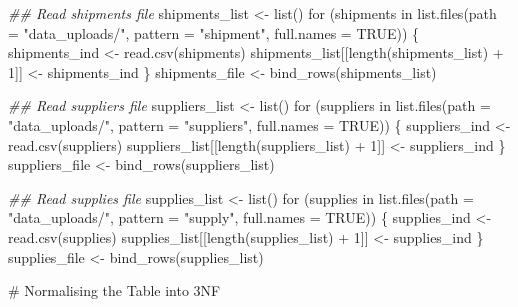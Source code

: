 \documentclass[
  letterpaper,
  DIV=11,
  numbers=noendperiod]{scrartcl}
\newenvironment{Shaded}{\begin{snugshade}}{\end{snugshade}}
\newcommand{\AttributeTok}[1]{\textcolor[rgb]{0.40,0.45,0.13}{#1}}
\newcommand{\CommentTok}[1]{\textcolor[rgb]{0.37,0.37,0.37}{#1}}
\newcommand{\ConstantTok}[1]{\textcolor[rgb]{0.56,0.35,0.01}{#1}}
\newcommand{\ControlFlowTok}[1]{\textcolor[rgb]{0.00,0.23,0.31}{#1}}
\newcommand{\DecValTok}[1]{\textcolor[rgb]{0.68,0.00,0.00}{#1}}
\newcommand{\DocumentationTok}[1]{\textcolor[rgb]{0.37,0.37,0.37}{\textit{#1}}}
\newcommand{\FunctionTok}[1]{\textcolor[rgb]{0.28,0.35,0.67}{#1}}
\newcommand{\NormalTok}[1]{\textcolor[rgb]{0.00,0.23,0.31}{#1}}
\newcommand{\OtherTok}[1]{\textcolor[rgb]{0.00,0.23,0.31}{#1}}
\newcommand{\SpecialCharTok}[1]{\textcolor[rgb]{0.37,0.37,0.37}{#1}}
\newcommand{\StringTok}[1]{\textcolor[rgb]{0.13,0.47,0.30}{#1}}
\begin{document}
\begin{Shaded}
\begin{Highlighting}[numbers=left,,]
\DocumentationTok{\#\# Read shipments file}
\NormalTok{shipments\_list }\OtherTok{\textless{}{-}} \FunctionTok{list}\NormalTok{()}
\ControlFlowTok{for}\NormalTok{ (shipments }\ControlFlowTok{in} \FunctionTok{list.files}\NormalTok{(}\AttributeTok{path =} \StringTok{"data\_uploads/"}\NormalTok{, }\AttributeTok{pattern =} \StringTok{"shipment"}\NormalTok{, }\AttributeTok{full.names =} \ConstantTok{TRUE}\NormalTok{)) \{}
\NormalTok{  shipments\_ind }\OtherTok{\textless{}{-}} \FunctionTok{read.csv}\NormalTok{(shipments)}
\NormalTok{  shipments\_list[[}\FunctionTok{length}\NormalTok{(shipments\_list) }\SpecialCharTok{+} \DecValTok{1}\NormalTok{]] }\OtherTok{\textless{}{-}}\NormalTok{ shipments\_ind}
\NormalTok{\}}
\NormalTok{shipments\_file }\OtherTok{\textless{}{-}} \FunctionTok{bind\_rows}\NormalTok{(shipments\_list)}

\DocumentationTok{\#\# Read suppliers file}
\NormalTok{suppliers\_list }\OtherTok{\textless{}{-}} \FunctionTok{list}\NormalTok{()}
\ControlFlowTok{for}\NormalTok{ (suppliers }\ControlFlowTok{in} \FunctionTok{list.files}\NormalTok{(}\AttributeTok{path =} \StringTok{"data\_uploads/"}\NormalTok{, }\AttributeTok{pattern =} \StringTok{"suppliers"}\NormalTok{, }\AttributeTok{full.names =} \ConstantTok{TRUE}\NormalTok{)) \{}
\NormalTok{  suppliers\_ind }\OtherTok{\textless{}{-}} \FunctionTok{read.csv}\NormalTok{(suppliers)}
\NormalTok{  suppliers\_list[[}\FunctionTok{length}\NormalTok{(suppliers\_list) }\SpecialCharTok{+} \DecValTok{1}\NormalTok{]] }\OtherTok{\textless{}{-}}\NormalTok{ suppliers\_ind}
\NormalTok{\}}
\NormalTok{suppliers\_file }\OtherTok{\textless{}{-}} \FunctionTok{bind\_rows}\NormalTok{(suppliers\_list)}

\DocumentationTok{\#\# Read supplies file}
\NormalTok{supplies\_list }\OtherTok{\textless{}{-}} \FunctionTok{list}\NormalTok{()}
\ControlFlowTok{for}\NormalTok{ (supplies }\ControlFlowTok{in} \FunctionTok{list.files}\NormalTok{(}\AttributeTok{path =} \StringTok{"data\_uploads/"}\NormalTok{, }\AttributeTok{pattern =} \StringTok{"supply"}\NormalTok{, }\AttributeTok{full.names =} \ConstantTok{TRUE}\NormalTok{)) \{}
\NormalTok{  supplies\_ind }\OtherTok{\textless{}{-}} \FunctionTok{read.csv}\NormalTok{(supplies)}
\NormalTok{  supplies\_list[[}\FunctionTok{length}\NormalTok{(supplies\_list) }\SpecialCharTok{+} \DecValTok{1}\NormalTok{]] }\OtherTok{\textless{}{-}}\NormalTok{ supplies\_ind}
\NormalTok{\}}
\NormalTok{supplies\_file }\OtherTok{\textless{}{-}} \FunctionTok{bind\_rows}\NormalTok{(supplies\_list)}

\CommentTok{\# Normalising the Table into 3NF}


\end{Highlighting}
\end{Shaded}
\end{document}
